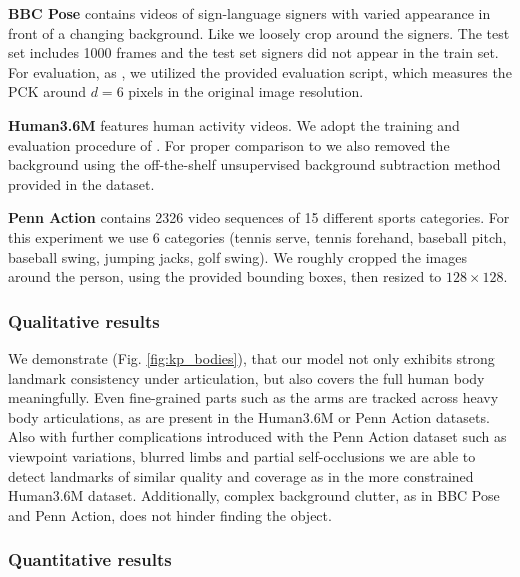 			\begin{tcolorbox}
				\textbf{BBC Pose} \cite{charles13bbcpose} contains videos of sign-language signers with varied appearance in front of a changing background. Like \cite{jakab18} we loosely crop around the signers.
				The test set includes 1000 frames and the test set signers did not appear in the train set.
				For evaluation, as \cite{jakab18}, we utilized the provided evaluation script, which measures the PCK around $d=6$ pixels in the original image resolution.
			\end{tcolorbox}
			\begin{tcolorbox}
				\textbf{Human3.6M} \cite{ionescu14human36m} features human activity videos.
				We adopt the training and evaluation procedure of \cite{zhang18}.
				For proper comparison to \cite{zhang18} we also removed the background using the off-the-shelf unsupervised background subtraction method provided in the dataset.
			\end{tcolorbox}
			\begin{tcolorbox}
				\textbf{Penn Action} \cite{zhang13penn} contains 2326 video sequences of 15 different sports categories.
				For this experiment we use 6 categories (tennis serve, tennis forehand, baseball pitch, baseball swing, jumping jacks, golf swing).
				We roughly cropped the images around the person, using the provided bounding boxes, then resized to $128\times128$.
			\end{tcolorbox}

		\subsubsection{Qualitative results}
			We demonstrate (Fig. \ref{fig:kp_bodies}), that our model not only exhibits strong landmark consistency under articulation, but also covers the full human body meaningfully.
			Even fine-grained parts such as the arms are tracked across heavy body articulations, as are present in the Human3.6M or Penn Action datasets.
			Also with further complications introduced with the Penn Action dataset such as viewpoint variations, blurred limbs and partial self-occlusions we are able to detect landmarks of similar quality and coverage as in the more constrained Human3.6M dataset.
			Additionally, complex background clutter, as in BBC Pose and Penn Action, does not hinder finding the object.

		\subsubsection{Quantitative results}

